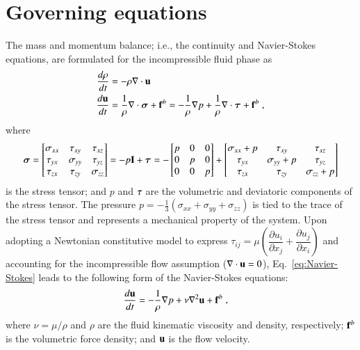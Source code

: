 \documentclass[final,3p,times]{elsarticle}
\begin{document}
\section{Governing equations} \label{sec:Method}
The mass and momentum balance; i.e., the continuity and Navier-Stokes equations, are formulated for the incompressible fluid phase as \cite{gurtin2010mechanics}
\begin{align}
\frac{d\rho}{dt} & =-\rho\nabla \cdot {\bf u}  \label{eq:Continutiy} \\
\frac{d{\bf u}}{dt} & = \frac{1}{\rho} \nabla \cdot \boldsymbol{\sigma} +{\bf f}^b=-\frac{1}{\rho} \nabla p +  \frac{1}{\rho} \nabla \cdot \boldsymbol{\tau}+{\bf f}^b \label{eq:Navier-Stokes} \; ,
\end{align}
where 
\begin{align*}
\boldsymbol{\sigma} =
\begin{bmatrix}
\sigma_{xx} &\tau_{xy}      &\tau_{xz}\\
\tau_{yx} &\sigma_{yy} &\tau_{yz}\\
\tau_{zx} &\tau_{zy}      &\sigma_{zz}\\
\end{bmatrix} =
 -p{\bf I}+\boldsymbol{\tau}
=
-\begin{bmatrix}
p&0 &0\\
0 &p &0\\
0 &0 &p\\
\end{bmatrix}
+
\begin{bmatrix}
\sigma_{xx}+p &\tau_{xy} &\tau_{xz}\\
\tau_{yx} &\sigma_{yy}+p &\tau_{yz}\\
\tau_{zx} &\tau_{zy}  &\sigma_{zz}+p\\
\end{bmatrix}
\end{align*}
is the stress tensor; and $p$ and $\bf \tau$ are the volumetric and deviatoric components of the stress tensor. The pressure $p=-\frac{1}{3}(\sigma_{xx}+\sigma_{yy}+\sigma_{zz})$ is tied to the trace of the stress tensor and represents a mechanical property of the system. Upon adopting a Newtonian constitutive model to express $\tau_{ij}=\mu (\dfrac{\partial u_i}{\partial x_j}+\dfrac{\partial u_j}{\partial x_i})$ and accounting for the incompressible flow assumption ($\nabla \cdot {\bf u}=0$), Eq.~\eqref{eq:Navier-Stokes} leads to the following form of the Navier-Stokes equations:
\begin{align}
\frac{d{\bf u}}{dt} & =-\frac{1}{\rho} \nabla p + \nu \nabla^{2} {\bf u}+{\bf f}^b \label{eq:NS} \; ,
\end{align}
where $\nu=\mu/\rho $ and $\rho$ are the fluid kinematic viscosity and density, respectively; ${\bf f}^b$ is the volumetric force density; and $\mathbf{u}$ is the flow velocity. 
\end{document}
